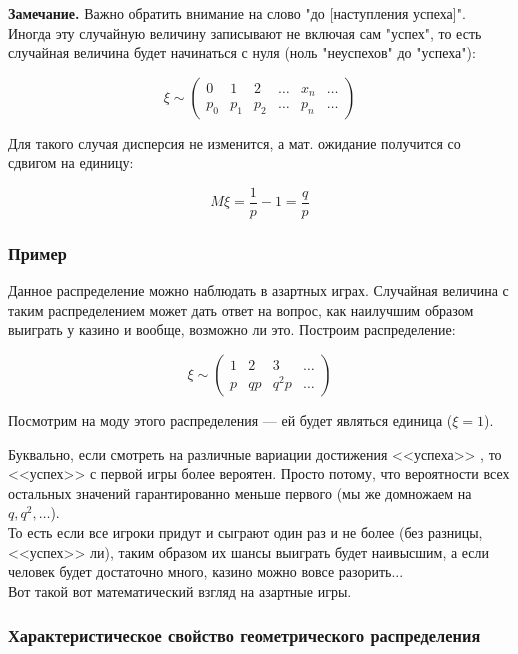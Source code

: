 \documentclass{article}
\begin{document}
\quad

\textbf{Замечание.} Важно обратить внимание на слово "до [наступления успеха]". Иногда эту случайную величину записывают не включая сам "успех", то есть случайная величина будет начинаться с нуля (ноль "неуспехов" до "успеха"):

$$\xi \sim
\begin{pmatrix}
0 & 1 & 2 & \ldots & x_n & \ldots\\
p_0 & p_1 & p_2 & \ldots & p_n & \ldots
\end{pmatrix}$$

Для такого случая дисперсия не изменится, а мат. ожидание получится со сдвигом на единицу:

$$M\xi = \frac{1}{p} - 1 = \frac{q}{p}$$

\subsubsection{Пример}

Данное распределение можно наблюдать в азартных играх. Случайная величина с таким распределением может дать ответ на вопрос, как наилучшим образом выиграть у казино и вообще, возможно ли это. Построим распределение:

$$\xi \sim
\begin{pmatrix}
1 & 2 & 3 & \ldots \\
p & qp & q^2p & \ldots
\end{pmatrix}$$

Посмотрим на моду этого распределения --- ей будет являться единица ($\xi = 1$).

Буквально, если смотреть на различные вариации достижения <<успеха>> , то <<успех>>  с первой игры более вероятен. Просто потому, что вероятности всех остальных значений гарантированно меньше первого (мы же домножаем на $q, q^2, \ldots$).
\\

То есть если все игроки придут и сыграют один раз и не более (без разницы, <<успех>> ли), таким образом их шансы выиграть будет наивысшим, а если человек будет достаточно много, казино можно вовсе разорить...
\\

Вот такой вот математический взгляд на азартные игры.

\subsubsection{Характеристическое свойство геометрического распределения}
\end{document}
